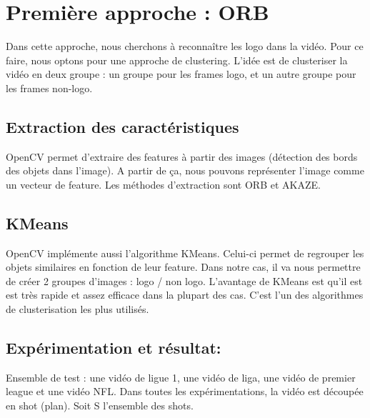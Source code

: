 \documentclass[11pt]{article}
\begin{document}
\section{Première approche : ORB}
\label{sec-6}
Dans cette approche, nous cherchons à reconnaître les logo dans la vidéo.
Pour ce faire, nous optons pour une approche de clustering. L'idée 
est de clusteriser la vidéo en deux groupe : un groupe pour les frames 
logo, et un autre groupe pour les frames non-logo.

\subsection{Extraction des caractéristiques}
\label{sec-6-1}
OpenCV permet d'extraire des features à partir des images (détection des bords 
des objets dans l'image).
A partir de ça, nous pouvons représenter l'image comme un vecteur de feature.
Les méthodes d'extraction sont ORB et AKAZE.

\subsection{KMeans}
\label{sec-6-2}
OpenCV implémente aussi l'algorithme KMeans. Celui-ci permet de regrouper les
objets similaires en fonction de leur feature. Dans notre cas, il va nous 
permettre de créer 2 groupes d'images : logo / non logo.
L'avantage de KMeans est qu'il est est très rapide et assez efficace dans la
plupart des cas. C'est l'un des algorithmes de clusterisation les plus utilisés.


\subsection{Expérimentation et résultat:}
\label{sec-6-3}
Ensemble de test : une vidéo de ligue 1, une vidéo de liga, une vidéo de 
premier league et une vidéo NFL.
Dans toutes les expérimentations, la vidéo est découpée en shot (plan). 
Soit S l'ensemble des shots.
\end{document}
